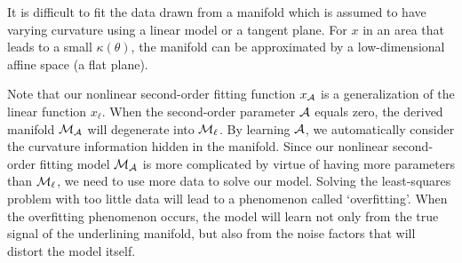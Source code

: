\documentclass{article}
\theoremstyle{remark}
\begin{document}
\vspace{-8mm}
\begin{table}[ht]
\centering
\label{circle_result}
\caption{The values of $c(\hat{\cal M})$ varies with $h$ for different algorithms}
\end{table}

\vspace{-4mm}
It is difficult to fit the data drawn from a manifold which is assumed to have varying curvature using a linear model or a tangent plane. For $x$ in an area that leads to a small $\kappa(\theta)$, the manifold can be approximated by a low-dimensional affine space (a flat plane). %

Note that our nonlinear second-order fitting function $x_{\cal A}$ is a generalization of the linear function $x_\ell$. When the second-order parameter $\cal A$ equals zero, the derived manifold $\cal M_A$ will degenerate into ${\cal M}_\ell$. By learning $\cal A$, we automatically consider the curvature information hidden in the manifold. Since our nonlinear second-order fitting model $\cal M_A$ is more complicated by virtue of  having more parameters than  ${\cal M}_\ell$, we need to use more data to solve our model. Solving the least-squares problem with too little data will lead to a phenomenon called `overfitting'. When the overfitting phenomenon occurs, the model will learn not only from the true signal of the underlining manifold, but also from the noise factors that will distort the model itself.
\end{document}
